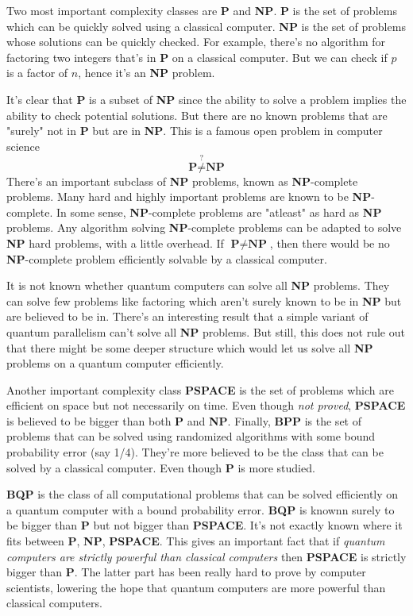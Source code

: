Two most important complexity classes are \textbf{P} and \textbf{NP}. \textbf{P} is the set of problems which can be quickly solved using a classical computer. \textbf{NP} is the set of problems whose solutions can be quickly checked. For example, there's no algorithm for factoring two integers that's in \textbf{P} on a classical computer. But we can check if $p$ is a factor of $n$, hence it's an \textbf{NP} problem.

It's clear that \textbf{P} is a subset of \textbf{NP} since the ability to solve a problem implies the ability to check potential solutions. But there are no known problems that are "surely" not in \textbf{P} but are in \textbf{NP}. This is a famous open problem in computer science
\begin{equation}
    \textbf{P} \stackrel{?}{\neq} \textbf{NP}
\end{equation}
There's an important subclass of \textbf{NP} problems, known as \textbf{NP}-complete problems. Many hard and highly important problems are known to be \textbf{NP}-complete. In some sense, \textbf{NP}-complete problems are "atleast" as hard as \textbf{NP} problems. Any algorithm solving \textbf{NP}-complete problems can be adapted to solve \textbf{NP} hard problems, with a little overhead. If $\textbf{P}\neq\textbf{NP}$, then there would be no \textbf{NP}-complete problem efficiently solvable by a classical computer.

It is not known whether quantum computers can solve all \textbf{NP} problems. They can solve few problems like factoring which aren't surely known to be in \textbf{NP} but are believed to be in. There's an interesting result that a simple variant of quantum parallelism can't solve all \textbf{NP} problems. But still, this does not rule out that there might be some deeper structure which would let us solve all \textbf{NP} problems on a quantum computer efficiently.

Another important complexity class \textbf{PSPACE} is the set of problems which are efficient on space but not necessarily on time. Even though \textit{not proved}, \textbf{PSPACE} is believed to be bigger than both \textbf{P} and \textbf{NP}. Finally, \textbf{BPP} is the set of problems that can be solved using randomized algorithms with some bound probability error (say 1/4). They're more believed to be the class that can be solved by a classical computer. Even though \textbf{P} is more studied.

\textbf{BQP} is the class  of all computational problems that can be solved efficiently on a quantum computer with a bound probability error. \textbf{BQP} is knownn surely to be bigger than \textbf{P} but not bigger than \textbf{PSPACE}. It's not exactly known where it fits between \textbf{P}, \textbf{NP}, \textbf{PSPACE}.    This gives an important fact that if \textit{quantum computers are strictly powerful than classical computers} then \textbf{PSPACE} is strictly bigger than \textbf{P}. The latter part has been really hard to prove by computer scientists, lowering the hope that quantum computers are more powerful than classical computers.

